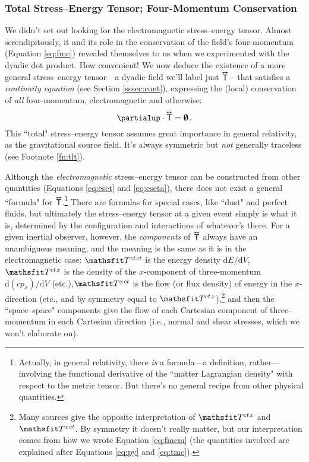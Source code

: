 \documentclass[12pt]{article}
\newcommand{\dd}[1]{\mathrm{d}#1}
\newcommand{\tightoverset}[2]{%
  \mathop{#2}\limits^{\vbox to -.5ex{\kern-0.75ex\hbox{$#1$}\vss}}}
\newcommand{\inlinedy}[1]{\tightoverset{\text{\tiny$\bm\leftrightarrow$}}{#1}}
\newcommand{\capdy}[1]{ \overset{ \text{\tiny$\bm\leftrightarrow$} }{\vphantom{\text{\small{A}}}\smash{#1}} }
\begin{document}
\subsubsection{Total Stress--Energy Tensor; Four-Momentum Conservation}\label{sssec:tset}

We didn't set out looking for the electromagnetic stress--energy tensor. Almost serendipitously, it and its role in the conservation of the field's four-momentum (Equation \ref{eq:fmc}) revealed themselves to us when we experimented with the dyadic dot product. How convenient! We now deduce the existence of a more general stress--energy tensor---a dyadic field we'll label just ${\inlinedy{\mathsf{T}}}$---that satisfies a \emph{continuity equation} (see Section \ref{sssec:cont}), expressing the (local) conservation of \emph{all} four-momentum, electromagnetic and otherwise:
\begin{equation}\label{eq:set}
\partialup \cdot \capdy{\mathsf{T}} = \textrm{\mbox{\boldmath $\emptyset$}} \, .
\end{equation}
This ``total" stress--energy tensor assumes great importance in general relativity, as the gravitational source field. It's always symmetric but \emph{not} generally traceless (see Footnote \ref{fn:tlt}).

Although the \emph{electromagnetic} stress--energy tensor can be constructed from other quantities (Equations \ref{eq:eset} and \ref{eq:eseta}), there does not exist a general ``formula" for ${\inlinedy{\mathsf{T}}}$.\footnote{\label{fn:setgr}Actually, in general relativity, there \emph{is} a formula---a definition, rather---involving the functional derivative of the ``matter Lagrangian density" with respect to the metric tensor. But there's no general recipe from other physical quantities.} There are formulas for special cases, like ``dust" and perfect fluids, but ultimately the stress--energy tensor at a given event simply is what it is, determined by the configuration and interactions of whatever's there. For a given inertial observer, however, the \emph{components} of ${\inlinedy{\mathsf{T}}}$ always have an unambiguous meaning, and the meaning is the same as it is in the electromagnetic case: $\mathsfit T^{ct \mkern1.5mu ct}$ is the energy density $\dd E / \dd V$, $\mathsfit T^{ct \mkern1.5mu x}$ is the density of the $x$-component of three-momentum $\dd (c p_x) / \dd V$ (etc.),$\mathsfit T^{x \mkern1.5mu ct}$ is the flow (or flux density) of energy in the $x$-direction (etc., and by symmetry equal to $\mathsfit T^{ct \mkern1.5mu x}$),\footnote{Many sources give the opposite interpretation of $\mathsfit T^{ct \mkern1.5mu x}$ and $\mathsfit T^{x \mkern1.5mu ct}$. By symmetry it doesn't really matter, but our interpretation comes from how we wrote Equation \ref{eq:fmcm} (the quantities involved are explained after Equations \ref{eq:py} and \ref{eq:tmc}).} and then the ``space--space" components give the flow of each Cartesian component of three-momentum in each Cartesian direction (i.e., normal and shear stresses, which we won't elaborate on).
\end{document}
